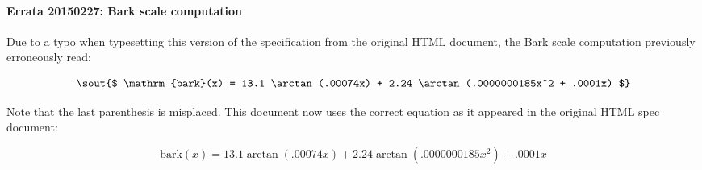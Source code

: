 \paragraph{Errata 20150227: Bark scale computation}

Due to a typo when typesetting this version of the specification from the original HTML document, the Bark scale computation previously erroneously read:

    \begin{displaymath}
      \hbox{\sout{$
      \mathrm{bark}(x) = 13.1 \arctan (.00074x) + 2.24 \arctan (.0000000185x^2 + .0001x)
      $}}
    \end{displaymath}

Note that the last parenthesis is misplaced.  This document now uses the correct equation as it appeared in the original HTML spec document:

    \begin{displaymath}
      \mathrm{bark}(x) = 13.1 \arctan (.00074x) + 2.24 \arctan (.0000000185x^2) + .0001x
    \end{displaymath}

